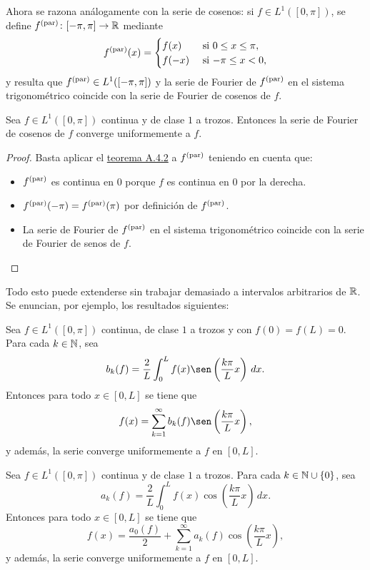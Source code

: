 \documentclass[a4paper, 12pt, extrafontsizes]{memoir}
\begin{document}
Ahora se razona análogamente con la serie de cosenos: si $f \in L^1([0,\pi])$, se define $f^{(\textup{par})} \colon [-\pi,\pi] \to \mathbb R$ mediante
\[f^{(\textup{par})}(x) = \begin{cases}
    f(x) & $ si $ 0 \leq x \leq \pi, \\
    f(-x) & $ si $ -\pi \leq x < 0,
\end{cases}\]
y resulta que $f^{(\textup{par})} \in L^1([-\pi,\pi])$ y la serie de Fourier de $f^{(\textup{par})}$ en el sistema trigonométrico coincide con la serie de Fourier de cosenos de $f$.

\begin{corollary}
    Sea $f \in L^1([0,\pi])$ continua y de clase $1$ a trozos. Entonces la serie de Fourier de cosenos de $f$ converge uniformemente a $f$.
\end{corollary}

\begin{proof}
    Basta aplicar el \hyperref[teo:A.4.2]{\color{gray}teorema A.4.2} a $f^{(\textup{par})}$ teniendo en cuenta que:
    \begin{itemize}
    \item $f^{(\textup{par})}$ es continua en 0 porque $f$ es continua en $0$ por la derecha.
    \item $f^{(\textup{par})}(-\pi) = f^{(\textup{par})}(\pi)$ por definición de $f^{(\textup{par})}$.
    \item La serie de Fourier de $f^{(\textup{par})}$ en el sistema trigonométrico coincide con la serie de Fourier de senos de $f$. \qedhere
    \end{itemize} 
\end{proof}

Todo esto puede extenderse sin trabajar demasiado a intervalos arbitrarios de $\mathbb R$. Se enuncian, por ejemplo, los resultados siguientes:

\begin{proposition}
    Sea $f \in L^1([0,\pi])$ continua, de clase $1$ a trozos y con $f(0) = f(L) = 0$. Para cada $k \in \mathbb N$, sea
    \[b_k(f) = \frac{2}{L}\int_0^L f(x)\sen\left(\frac{k\pi}{L}x\right) \, dx.\]
    Entonces para todo $x \in [0,L]$ se tiene que
    \[f(x)=\sum_{k=1}^\infty b_k(f)\sen\left(\frac{k\pi}{L}x\right),\]
    y además, la serie converge uniformemente a $f$ en $[0,L]$.
\end{proposition}

\begin{proposition}
    Sea $f \in L^1([0,\pi])$ continua y de clase $1$ a trozos. Para cada $k \in \mathbb N \cup \{0\}$, sea
    \[a_k(f) = \frac{2}{L}\int_0^L f(x)\cos\left(\frac{k\pi}{L}x\right) \, dx.\]
    Entonces para todo $x \in [0,L]$ se tiene que
    \[f(x)=\frac{a_0(f)}{2}+\sum_{k=1}^\infty a_k(f)\cos\left(\frac{k\pi}{L}x\right),\]
    y además, la serie converge uniformemente a $f$ en $[0,L]$.
\end{proposition}
\end{document}
